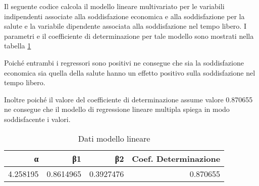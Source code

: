 \documentclass[]{book}
\newenvironment{Shaded}{\begin{snugshade}}{\end{snugshade}}
\newcommand{\KeywordTok}[1]{\textcolor[rgb]{0.13,0.29,0.53}{\textbf{#1}}}
\newcommand{\DecValTok}[1]{\textcolor[rgb]{0.00,0.00,0.81}{#1}}
\newcommand{\StringTok}[1]{\textcolor[rgb]{0.31,0.60,0.02}{#1}}
\newcommand{\OperatorTok}[1]{\textcolor[rgb]{0.81,0.36,0.00}{\textbf{#1}}}
\newcommand{\NormalTok}[1]{#1}
\begin{document}
Il seguente codice calcola il modello lineare multivariato per le
variabili indipendenti associate alla soddisfazione economica e alla
soddisfazione per la salute e la variabile dipendente associata alla
soddisfazione nel tempo libero. I parametri e il coefficiente di
determinazione per tale modello sono mostrati nella tabella
\ref{tab:modello-lineare-multivariato-dati}

\begin{Shaded}
\end{Shaded}

Poiché entrambi i regressori sono positivi ne consegue che sia la
soddisfazione economica sia quella della salute hanno un effetto
positivo sulla soddisfazione nel tempo libero.

Inoltre poiché il valore del coefficiente di determinazione assume
valore 0.870655 ne consegue che il modello di regressione lineare
multipla spiega in modo soddisfacente i valori.

\begin{table}

\caption{\label{tab:modello-lineare-multivariato-dati}Dati modello lineare}
\centering
\begin{tabular}[t]{r|r|r|r}
\hline
α & β1 & β2 & Coef. Determinazione\\
\hline
4.258195 & 0.8614965 & 0.3927476 & 0.870655\\
\hline
\end{tabular}
\end{table}
\end{document}
